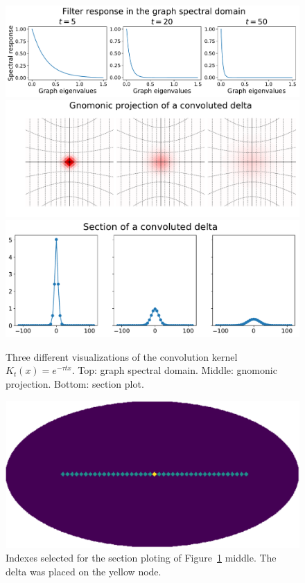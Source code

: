 \documentclass[final,twocolumn,3p,times,authoryear]{elsarticle}
\newcommand{\figref}[1]{Figure~\ref{fig:#1}}
\newcommand{\1}{\b{1}}              %
\newcommand{\0}{\b{0}}              %
\begin{document}
\begin{figure}[!ht]
\centering
\includegraphics[width=\linewidth]{gaussian_filters_spectral}
\includegraphics[width=\linewidth]{gaussian_filters_gnomonic}
\includegraphics[width=\linewidth]{gaussian_filters_section}
\caption{Three different visualizations of the convolution kernel $K_t(x)=e^{-\tau t x}$.
Top: graph spectral domain.
Middle: gnomonic projection.
Bottom: section plot.}
\label{fig:gaussian_filters_visualization}
\end{figure}

\begin{figure}[!ht]
\centering
\includegraphics[width=0.6\linewidth]{index_plotting_order20_nside16}
\caption{Indexes selected for the section ploting of \figref{gaussian_filters_visualization} middle. The delta was placed on the yellow node.}
\label{fig:index_section}
\end{figure}
\end{document}
